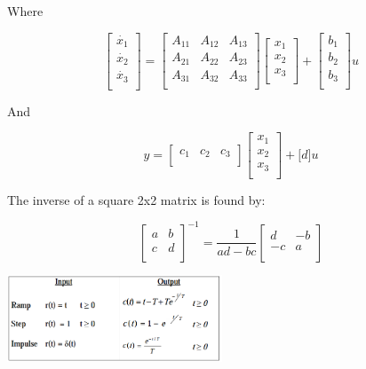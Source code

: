 \documentclass[a0,landscape]{article}
\begin{document}
\begin{multicols}{3}
Where

\[\begin{bmatrix}
\dot{x_{1}} \\
\dot{x_{2}} \\
\dot{x_{3}} \\
\end{bmatrix} = \begin{bmatrix}
A_{11} & A_{12} & A_{13} \\
A_{21} & A_{22} & A_{23} \\
A_{31} & A_{32} & A_{33} \\
\end{bmatrix}\begin{bmatrix}
x_{1} \\
x_{2} \\
x_{3} \\
\end{bmatrix} + \begin{bmatrix}
b_{1} \\
b_{2} \\
b_{3} \\
\end{bmatrix}u\]

And

\[y = \begin{bmatrix}
c_{1} & c_{2} & c_{3} \\
\end{bmatrix}\begin{bmatrix}
x_{1} \\
x_{2} \\
x_{3} \\
\end{bmatrix} + \lbrack d\rbrack u\]

The inverse of a square 2x2 matrix is found by:

\[\begin{bmatrix}
a & b \\
c & d \\
\end{bmatrix}^{- 1} = \frac{1}{ad - bc}\begin{bmatrix}
d & - b \\
 - c & a \\
\end{bmatrix}\]

\includegraphics[width=2.52147in,height=1.02367in]{media/image8.png}


\end{multicols}
\end{document}
